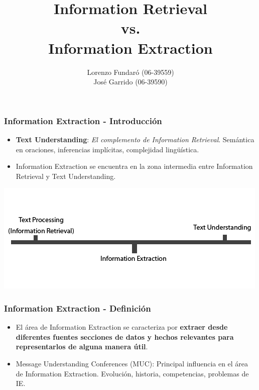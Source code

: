 \documentclass[xcolor=dvipsnames]{beamer}
\author{Lorenzo Fundaró (06-39559)\\ José Garrido (06-39590)}
\title{Information Retrieval \\vs. \\Information Extraction}
\institute{Universidad Simón Bolívar\\Inteligencia Artificial 2}
\begin{document}
\begin{frame}
\titlepage
\end{frame}


\begin{frame}
\frametitle{Information Extraction - Introducción}
\begin{itemize}
 \item \textbf{Text Understanding}: \emph{El complemento de Information Retrieval}. Semántica en oraciones, inferencias implícitas, complejidad lingüística.
 \item Information Extraction se encuentra en la zona intermedia entre Information Retrieval y Text Understanding.
\end{itemize}
\begin{center}
\includegraphics[scale=0.4]{IEandIR.png}
\end{center}
\end{frame}

\begin{frame}
\frametitle{Information Extraction - Definición}
\begin{itemize}
 \item El área de Information Extraction se caracteriza por \textbf{extraer desde diferentes fuentes secciones de datos y hechos relevantes para representarlos de alguna manera útil}.
 \item Message Understanding Conferences (MUC): Principal influencia en el área de Information Extraction. Evolución, historia, competencias, problemas de IE.
\end{itemize}
\end{frame}
\end{document}
